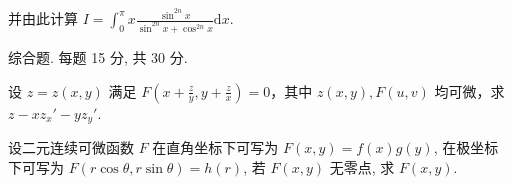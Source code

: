 \nopagebreak[4]
并由此计算 $I = \int_0^\pi x\frac{\sin^{2n}x}{\sin^{2n}x + \cos^{2n}x}\mathrm{d}x.$\par
\par{}
综合题. 每题 15 分, 共 30 分.\par
设 $z = z(x, y)$ 满足 $F\left(x + \frac{z}{y}, y + \frac{z}{x}\right) = 0$，其中 $z(x, y), F(u, v)$ 均可微，求 $z - xz_x' - yz_y'$.\par
设二元连续可微函数 $F$ 在直角坐标下可写为 $F(x, y) = f(x)g(y)$, 在极坐标下可写为 $F(r \cos \theta, r \sin \theta) = h(r)$, 若 $F(x, y)$ 无零点, 求 $F(x, y)$.\par
